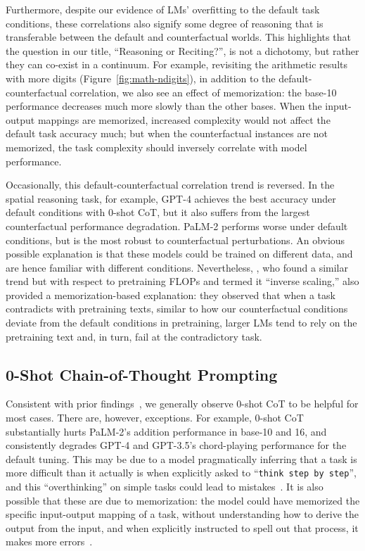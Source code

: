 Furthermore, despite our evidence of LMs' overfitting to the default task conditions, 
these correlations also signify some degree of reasoning that is transferable between the default and counterfactual worlds.
This highlights that the question in our title, ``Reasoning or Reciting?'', is not a dichotomy, but rather they can co-exist in a continuum.
For example, revisiting the arithmetic results with more digits (Figure~\ref{fig:math-ndigits}), in addition to the default-counterfactual correlation, we also see an effect of memorization:
the base-10 performance decreases much more slowly than the other bases. When the input-output mappings are memorized, increased complexity would not affect the default task accuracy much; but when the counterfactual instances are not memorized, the task complexity should inversely correlate with model performance.


Occasionally, this default-counterfactual correlation trend is reversed.
In the spatial reasoning task, for example, GPT-4 achieves the best accuracy under default conditions with 0-shot CoT, but it also suffers from the largest counterfactual performance degradation. PaLM-2 performs worse under default conditions, but is the most robust to counterfactual perturbations.
An obvious possible explanation is that these models could be trained on different data, and are hence familiar with different conditions. Nevertheless, \citet{mckenzie2023inverse}, who found a similar trend but with respect to pretraining FLOPs and termed it ``inverse scaling,'' also provided a memorization-based explanation: they observed that when a task contradicts with pretraining texts, similar to how our counterfactual conditions deviate from the default conditions in pretraining, larger LMs tend to rely on the pretraining text and, in turn, fail at the contradictory task.



\subsection{0-Shot Chain-of-Thought Prompting}

Consistent with prior findings~, we generally observe 0-shot CoT to be helpful for most cases.
There are, however, exceptions. For example, 0-shot CoT substantially hurts PaLM-2's addition performance in base-10 and 16, and consistently degrades GPT-4 and GPT-3.5's chord-playing performance for the default tuning. This may be due to a model pragmatically inferring that a task is more difficult than it actually is when  explicitly asked to ``\texttt{think step by step}'', and this ``overthinking'' on simple tasks could lead to mistakes~\citep{kojima2023large}. It is also possible that these are due to memorization: the model could have memorized the specific input-output mapping of a task, without understanding how to derive the output from the input, and when explicitly instructed to spell out that process, it makes more errors~\citep{zhang2023language}. 


